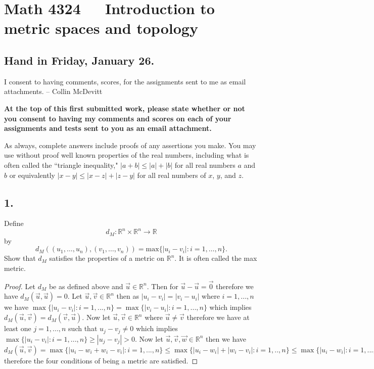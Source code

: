 \documentclass{amsart}
\theoremstyle{plain}
\theoremstyle{definition}
\theoremstyle{remark}
\begin{document}
\section*{Math 4324\ \ \  Introduction to metric spaces and topology }

\subsection*{Hand in Friday, January 26.}
I consent to having comments, scores, for the assignments sent to me as email attachments. -- Collin McDevitt

\vspace{.15in}
{\bf At the top of this first submitted work, please state whether or not you consent to having my comments and scores on each of your assignments and tests sent to you as an email attachment.}

\vspace{.15in}
As always, complete answers include proofs of any assertions you make. You may use without proof well known properties of the real numbers, including what is often called the ``triangle inequality," $|a+b| \le |a| + |b|$ for all real numbers $a$ and $b$ or equivalently $|x-y| \le |x-z| + |z-y|$ for all real numbers of $x$, $y$, and $z$.

\vspace{.15in}


\noindent
\subsection*{1.}  Define
\[
    d_M : \mathbb R ^n \times \mathbb R ^n \rightarrow \mathbb R
\]
by
\[
    d_M ( (u_1, \ldots , u_n) , (v_1, \ldots , v_n )) =\mbox{max} \{|u_i - v_i| : i = 1, \ldots , n \} .
\]
Show that $d_M$ satisfies the properties of a metric on $\mathbb R ^ n$. It is often called the max metric.
\vspace{.15in}

\begin{proof}
    Let $d_M$ be as defined above and $\vec{u}\in \mathbb{R}^n$. Then for $\vec{u}-\vec{u}=\vec{0}$ therefore we have $d_M(\vec{u},\vec{u})=0$. Let $\vec{u},\vec{v}\in \mathbb{R}^n$ then as $|u_i-v_i|=|v_i-u_i|$ where $i=1,...,n$ we have $\max\{|u_i-v_i|:i=1,...,n\}=\max\{|v_i-u_i|:i=1,...,n\}$ which implies $d_M(\vec{u},\vec{v})=d_M(\vec{v},\vec{u})$.
    Now let $\vec{u},\vec{v}\in \mathbb{R}^n$ where $\vec{u}\not = \vec{v}$ therefore we have at least one $j=1,...,n$ such that $u_j-v_j\not = 0$ which implies $\max\{|u_i-v_i|:i=1,...,n\}\geq |u_j-v_j|>0$. Now let $\vec{u},\vec{v},\vec{w}\in \mathbb{R}^n$ then we have $d_M(\vec{u},\vec{v})=\max\{|u_i-w_i+w_i-v_i|:i=1,...,n\}\leq \max\{|u_i-w_i|+|w_i-v_i|:i=1,..,n\}\leq \max\{|u_i-w_i|:i=1,...,n\}+\max\{|w_i-v_i|:i=1,...,n\}=d_M(\vec{u},\vec{w})+d_M(\vec{w},\vec{v})$ therefore the four conditions of being a metric are satisfied.
\end{proof}
\end{document}
